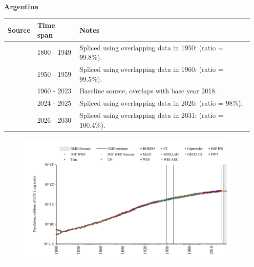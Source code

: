 \documentclass[12pt,a4paper,landscape]{article}
\begin{document}
\begin{adjustbox}{max totalsize={\paperwidth}{\paperheight},center}
\begin{minipage}[t][\textheight][t]{\textwidth}
\vspace*{0.5cm}
{}
\begin{center}
{\Large\bfseries Argentina}
\end{center}
\vspace{0.5cm}
\begin{table}[H]
\centering
\small
\begin{tabular}{|l|l|l|}
\hline
\textbf{Source} & \textbf{Time span} & \textbf{Notes} \\
\hline
\rowcolor{white}\cite{Gapminder}& 1800 - 1949 &Spliced using overlapping data in 1950: (ratio = 99.8\%).\\
\rowcolor{lightgray}\cite{IMF_IFS}& 1950 - 1959 &Spliced using overlapping data in 1960: (ratio = 99.5\%).\\
\rowcolor{white}\cite{WDI}& 1960 - 2023 &Baseline source, overlaps with base year 2018.\\
\rowcolor{lightgray}\cite{OECD_EO}& 2024 - 2025 &Spliced using overlapping data in 2026: (ratio = 98\%).\\
\rowcolor{white}\cite{Gapminder}& 2026 - 2030 &Spliced using overlapping data in 2031: (ratio = 100.4\%).\\
\hline
\end{tabular}
\end{table}
\begin{figure}[H]
\centering
\includegraphics[width=\textwidth,height=0.6\textheight,keepaspectratio]{graphs/ARG_pop.pdf}
\end{figure}
\end{minipage}
\end{adjustbox}
\end{document}
